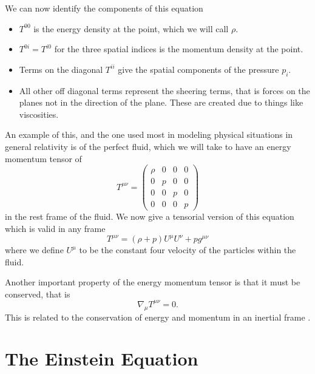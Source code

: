 We can now identify the components of this equation \cite{hartle, carroll}

\begin{itemize}
	\item \(T^{00}\) is the energy density at the point, which we will call \(\rho\). 
	\item \(T^{0i} = T^{i0}\) for the three spatial indices is the momentum density at the point.
	\item Terms on the diagonal \(T^{ii}\) give the spatial components of the pressure \(p_{i}\).
	\item All other off diagonal terms represent the sheering terms, that is forces on the planes not in the direction of the plane. These are created due to things like viscosities.
\end{itemize}

An example of this, and the one used most in modeling physical situations in general relativity is of the perfect fluid, which we will take to have an energy momentum tensor of \cite{carroll, hartle}
\begin{equation} \label{perfect-fluid}
	T^{\mu \nu} = 
	\begin{pmatrix}
	\rho & 0 & 0 & 0 \\
	0 & p & 0 & 0 \\
	0 & 0 & p & 0 \\
	0 & 0 & 0 & p
	\end{pmatrix}
\end{equation}
in the rest frame of the fluid. We now give a tensorial version of this equation which is valid in any frame \cite{carroll}
\begin{equation} \label{perfect-fluid-tensor}
	T^{\mu \nu} = (\rho + p) U^{\mu} U^{\nu} + p g^{\mu \nu}
\end{equation}
where we define \(U^{\mu}\) to be the constant four velocity of the particles within the fluid. 

Another important property of the energy momentum tensor is that it must be conserved, that is
\begin{equation} \label{e-m-conversed}
	\nabla_{\mu} T^{\mu \nu} = 0 .
\end{equation}
This is related to the conservation of energy and momentum in an inertial frame \cite{carroll, hartle}.

\section{The Einstein Equation}

